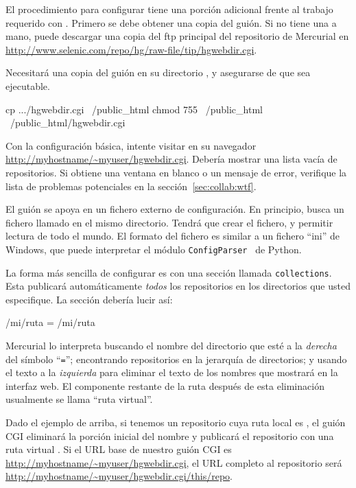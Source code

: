 El procedimiento para configurar  tiene una
porción adicional frente al trabajo requerido con
.  Primero se debe obtener una copia del
guión. Si no tiene una a mano, puede descargar una copia del ftp
principal del repositorio de Mercurial en
\url{http://www.selenic.com/repo/hg/raw-file/tip/hgwebdir.cgi}.

Necesitará una copia del guión en su directorio ,
y asegurarse de que sea ejecutable.
\begin{codesample2}
  cp .../hgwebdir.cgi ~/public_html
  chmod 755 ~/public_html ~/public_html/hgwebdir.cgi
\end{codesample2}
Con la configuración básica, intente visitar en su navegador
\url{http://myhostname/~myuser/hgwebdir.cgi}.  Debería mostrar una
lista vacía de repositorios.  Si obtiene una ventana en blanco o un
mensaje de error, verifique la lista de problemas potenciales en la 
sección~\ref{sec:collab:wtf}.

El guión  se apoya en un fichero externo de
configuración.  En principio, busca un fichero llamado
 en el mismo directorio.  Tendrá que crear el
fichero, y permitir lectura de todo el mundo.  El formato del fichero
es similar a un fichero ``ini'' de Windows, que puede interpretar el módulo
\texttt{ConfigParser}~\cite{web:configparser} de Python.

La forma más sencilla de configurar  es con
una sección llamada \texttt{collections}.  Esta publicará automáticamente
\emph{todos} los repositorios en los directorios que usted
especifique.  La sección debería lucir así:
\begin{codesample2}
  [collections]
  /mi/ruta = /mi/ruta
\end{codesample2}
Mercurial lo interpreta buscando el nombre del directorio que esté a la
\emph{derecha} del símbolo ``\texttt{=}''; encontrando repositorios en
la jerarquía de directorios; y usando el texto a la \emph{izquierda}
para eliminar el texto de los nombres que mostrará en la interfaz
web.  El componente restante de la ruta después de esta eliminación
usualmente se llama ``ruta virtual''.

Dado el ejemplo de arriba, si tenemos un repositorio cuya ruta local es
, el guión CGI eliminará la porción inicial
 del nombre y publicará el repositorio con una ruta
virtual .  Si el URL base de nuestro guión CGI es
\url{http://myhostname/~myuser/hgwebdir.cgi}, el URL completo al
repositorio será
\url{http://myhostname/~myuser/hgwebdir.cgi/this/repo}.

